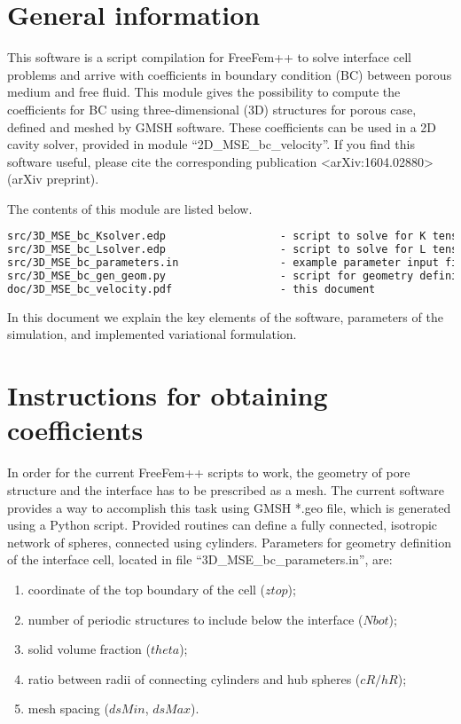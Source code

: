 \documentclass[12pt,a4paper]{article}
\begin{document}
\sloppy

\section{General information}

This software is a script compilation for FreeFem++ to solve interface cell problems and arrive with coefficients in boundary condition (BC) between porous medium and free fluid. This module gives the possibility to compute the coefficients for BC using three-dimensional (3D) structures for porous case, defined and meshed by GMSH software. These coefficients can be used in a 2D cavity solver, provided in module ``2D\_MSE\_bc\_velocity''. If you find this software useful, please cite the corresponding publication <arXiv:1604.02880> (arXiv preprint).

The contents of this module are listed below.
\begin{lstlisting}[language=tex]
src/3D_MSE_bc_Ksolver.edp                  - script to solve for K tensor
src/3D_MSE_bc_Lsolver.edp                  - script to solve for L tensor
src/3D_MSE_bc_parameters.in                - example parameter input file
src/3D_MSE_bc_gen_geom.py                  - script for geometry definition in GMSH *.geo format
doc/3D_MSE_bc_velocity.pdf                 - this document
\end{lstlisting}

In this document we explain the key elements of the software, parameters of the simulation, and implemented variational formulation.

\section{Instructions for obtaining coefficients}


In order for the current FreeFem++ scripts to work, the geometry of pore structure and the interface has to be prescribed as a mesh. The current software provides a way to accomplish this task using GMSH *.geo file, which is generated using a Python script. Provided routines can define a fully connected, isotropic network of spheres, connected using cylinders. Parameters for geometry definition of the interface cell, located in file ``3D\_MSE\_bc\_parameters.in'', are:
\begin{enumerate}
    \item coordinate of the top boundary of the cell ($ztop$);
	\item number of periodic structures to include below the interface ($Nbot$);
    \item solid volume fraction ($theta$);
    \item ratio between radii of connecting cylinders and hub spheres ($cR/hR$);
    \item mesh spacing ($dsMin$, $dsMax$).
\end{enumerate}
\end{document}
